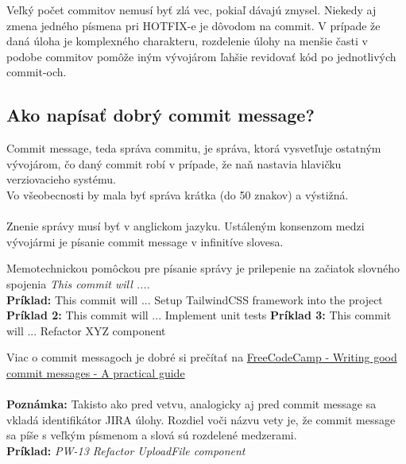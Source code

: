 \documentclass{article}
\begin{document}
            \noindent \textnormal{%
            Veľký počet commitov nemusí byť zlá vec, pokiaľ dávajú zmysel. Niekedy aj zmena jedného písmena pri HOTFIX-e je dôvodom na commit. V prípade že daná úloha je komplexného charakteru, rozdelenie úlohy na menšie časti v podobe commitov pomôže iným vývojárom ľahšie revidovať kód po jednotlivých commit-och.
            }

        \vspace*{.5cm}
        \subsection*{Ako napísať dobrý commit message?}

            \textnormal{%
            Commit message, teda správa commitu, je správa, ktorá vysvetľuje ostatným vývojárom, čo daný commit robí v prípade, že naň nastavia hlavičku verziovacieho systému. \\
            Vo všeobecnosti by mala byť správa krátka (do 50 znakov) a výstižná. \\\\
            Znenie správy musí byť v anglickom jazyku. Ustáleným konsenzom medzi vývojármi je písanie commit message v infinitíve slovesa.\\
            }

            \noindent \textnormal{%
            Memotechnickou pomôckou pre písanie správy je prilepenie na začiatok slovného spojenia \emph{This commit will ...}. \\
            \textbf{Príklad:} This commit will ... Setup TailwindCSS framework into the project \\
            \textbf{Príklad 2:} This commit will ... Implement unit tests
            \textbf{Príklad 3:} This commit will ... Refactor XYZ component \\
            }

            \noindent \textnormal{%
            Viac o commit messagoch je dobré si prečítať na
            \href{https://www.freecodecamp.org/news/writing-good-commit-messages-a-practical-guide/}{FreeCodeCamp - Writing good commit messages - A practical guide} \\\\
            \textbf{Poznámka:} Takisto ako pred vetvu, analogicky aj pred commit message sa vkladá identifikátor JIRA úlohy. Rozdiel voči názvu vety je, že commit message sa píše s veľkým písmenom a slová sú rozdelené medzerami. \\
            \textbf{Príklad:} \emph{PW-13 Refactor UploadFile component}
            }
    
\end{document}
